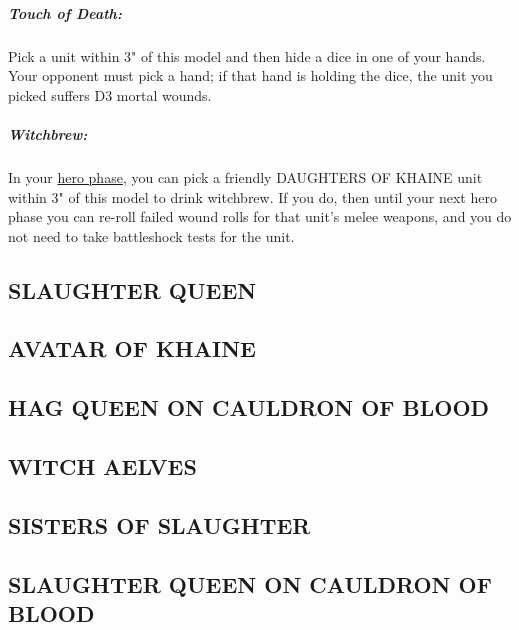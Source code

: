 \hypertarget{touch-of-death}{%
\subparagraph{Touch of Death:}\label{touch-of-death}}

Pick a unit within 3" of this model and then hide a dice in one of your
hands. Your opponent must pick a hand; if that hand is holding the dice,
the unit you picked suffers D3 mortal wounds.

\hypertarget{witchbrew}{%
\subparagraph{Witchbrew:}\label{witchbrew}}

In your \protect\hyperlink{1.-Heldenphase}{hero phase}, you can pick a
friendly DAUGHTERS OF KHAINE unit within 3" of this model to drink
witchbrew. If you do, then until your next hero phase you can re-roll
failed wound rolls for that unit's melee weapons, and you do not need to
take battleshock tests for the unit.

\hypertarget{slaughter-queen}{%
\subsection{SLAUGHTER QUEEN}\label{slaughter-queen}}

\hypertarget{avatar-of-khaine}{%
\subsection{AVATAR OF KHAINE}\label{avatar-of-khaine}}

\hypertarget{hag-queen-on-cauldron-of-blood}{%
\subsection{HAG QUEEN ON CAULDRON OF
BLOOD}\label{hag-queen-on-cauldron-of-blood}}

\hypertarget{witch-aelves}{%
\subsection{WITCH AELVES}\label{witch-aelves}}

\hypertarget{sisters-of-slaughter}{%
\subsection{SISTERS OF SLAUGHTER}\label{sisters-of-slaughter}}

\hypertarget{slaughter-queen-on-cauldron-of-blood}{%
\subsection{SLAUGHTER QUEEN ON CAULDRON OF
BLOOD}\label{slaughter-queen-on-cauldron-of-blood}}

